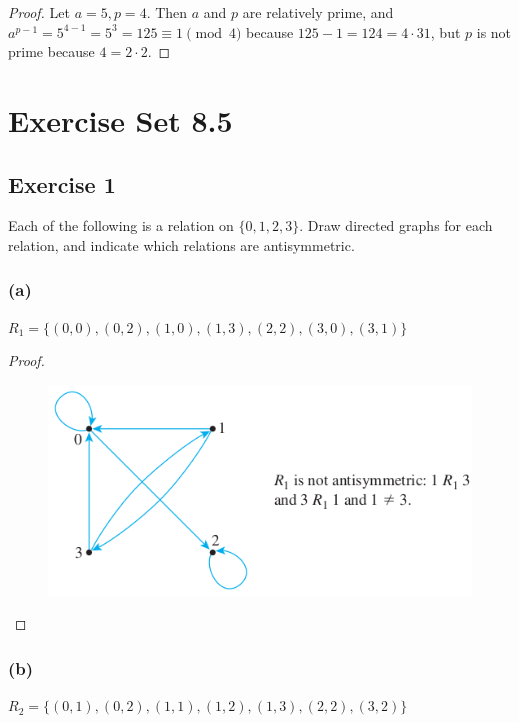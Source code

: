 \documentclass[14pt]{extarticle}
\begin{document}
\begin{proof}
        Let \(a = 5, p = 4\). Then $a$ and $p$ are relatively prime, and \(a^{p-1} = 5^{4-1}=5^3 = 125 \equiv 1 \pmod 4\)
        because \(125 - 1 = 124 = 4 \cdot 31\), but $p$ is not prime because \(4 = 2 \cdot 2\).
\end{proof}

\section{Exercise Set 8.5}

\subsection{Exercise 1}
Each of the following is a relation on \(\{0, 1, 2, 3\}\). Draw directed graphs for each relation, and indicate which
relations are antisymmetric.

\subsubsection{(a)}
\(R_1 = \{(0, 0), (0, 2), (1, 0), (1, 3), (2, 2), (3, 0), (3, 1)\}\)

\begin{proof}
        \begin{figure}[ht!]
                \centering
                \includegraphics[scale=0.5]{../images/8.5.1.a.png}
        \end{figure}
\end{proof}

\subsubsection{(b)}
\(R_2 = \{(0, 1), (0, 2), (1, 1), (1, 2), (1, 3), (2, 2), (3, 2)\}\)
\end{document}
